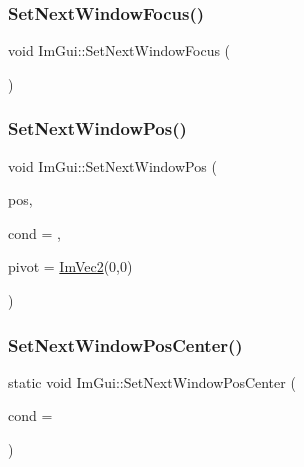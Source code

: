\subsubsection{\texorpdfstring{Set\+Next\+Window\+Focus()}{SetNextWindowFocus()}}
{\footnotesize\ttfamily void Im\+Gui\+::\+Set\+Next\+Window\+Focus (\begin{DoxyParamCaption}{ }\end{DoxyParamCaption})}

\hypertarget{namespace_im_gui_afbccd31113430670b5ab2bf0d6f509bf}{}\label{namespace_im_gui_afbccd31113430670b5ab2bf0d6f509bf} 
\subsubsection{\texorpdfstring{Set\+Next\+Window\+Pos()}{SetNextWindowPos()}}
{\footnotesize\ttfamily void Im\+Gui\+::\+Set\+Next\+Window\+Pos (\begin{DoxyParamCaption}\item[{const \hyperlink{struct_im_vec2}{Im\+Vec2} \&}]{pos,  }\item[{Im\+Gui\+Cond}]{cond = {},  }\item[{const \hyperlink{struct_im_vec2}{Im\+Vec2} \&}]{pivot = {\ttfamily \hyperlink{struct_im_vec2}{Im\+Vec2}(0,0)} }\end{DoxyParamCaption})}

\hypertarget{namespace_im_gui_a0d59dc9582f20c086d7882c86a41e8f2}{}\label{namespace_im_gui_a0d59dc9582f20c086d7882c86a41e8f2} 
\subsubsection{\texorpdfstring{Set\+Next\+Window\+Pos\+Center()}{SetNextWindowPosCenter()}}
{\footnotesize\ttfamily static void Im\+Gui\+::\+Set\+Next\+Window\+Pos\+Center (\begin{DoxyParamCaption}\item[{Im\+Gui\+Cond}]{cond = {} }\end{DoxyParamCaption})\hspace{0.3cm}{\ttfamily [static]}}

\hypertarget{namespace_im_gui_ab33717bb71ef5e393ae18656fc6b229d}{}\label{namespace_im_gui_ab33717bb71ef5e393ae18656fc6b229d} 

